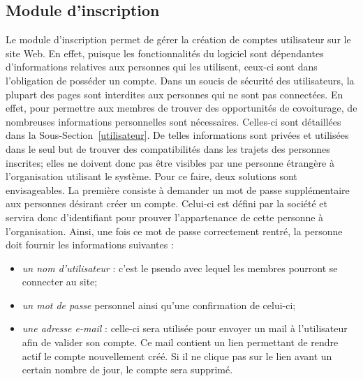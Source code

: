 \documentclass[12pt, a4paper, oneside]{article}
\begin{document}
\subsection{Module d'inscription}
    Le module d'inscription permet de gérer la création de comptes utilisateur sur le site Web. En effet, puisque les fonctionnalités du logiciel sont dépendantes d'informations relatives aux personnes qui les utilisent, ceux-ci sont dans l'obligation de posséder un compte. Dans un soucis de sécurité des utilisateurs, la plupart des pages sont interdites aux personnes qui ne sont pas connectées. En effet, pour permettre aux membres de trouver des opportunités de covoiturage, de nombreuses informations personnelles sont nécessaires. Celles-ci sont détaillées dans la Sous-Section~\ref{utilisateur}. De telles informations sont privées et utilisées dans le seul but de trouver des compatibilités dans les trajets des personnes inscrites; elles ne doivent donc pas être visibles par une personne étrangère à l'organisation utilisant le système. Pour ce faire, deux solutions sont envisageables. La première consiste à demander un mot de passe supplémentaire aux personnes désirant créer un compte. Celui-ci est défini par la société et servira donc d'identifiant pour prouver l'appartenance de cette personne à l'organisation. Ainsi, une fois ce mot de passe correctement rentré, la personne doit fournir les informations suivantes :\\
    \begin{itemize}
        \item \textit{un nom d'utilisateur} : c'est le pseudo avec lequel les membres pourront se connecter au site;
        \item \textit{un mot de passe} personnel ainsi qu'une confirmation de celui-ci;
        \item \textit{une adresse e-mail} : celle-ci sera utilisée pour envoyer un mail à l'utilisateur afin de valider son compte. Ce mail contient un lien permettant de rendre actif le compte nouvellement créé. Si il ne clique pas sur le lien avant un certain nombre de jour, le compte sera supprimé.\\
    \end{itemize}
\end{document}
